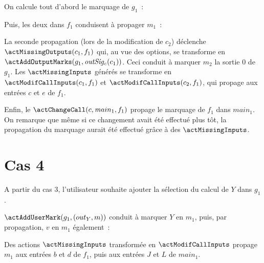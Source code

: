 On calcule tout d'abord le marquage de $g_1$~:

\bb

Puis, les deux \actChangeCall{} dans $f_1$ conduisent à propager $m_1$~:

\bb

La seconde propagation (lors de la modification de $c_2$)
déclenche $\actMissingOutputs(c_1, f_1)$
qui, au vue des options, se transforme en $\actAddOutputMarks(g_1,
\outsigc(c_1))$. Ceci conduit à marquer $m_2$ la sortie 0 de $g_1$.
Les $\actMissingInputs$ générés se transforme en $\actModifCallInputs(c_1, f_1)$
et $\actModifCallInputs(c_2, f_1)$, qui propage \spare{} aux entrées $c$ et $e$ de
$f_1$.

\bb

Enfin, le $\actChangeCall(c, {\mathit main}_1, f_1)$ propage le marquage de
$f_1$ dans ${\mathit main}_1$. On remarque que même si ce changement avait été
effectué plus tôt, la propagation du marquage aurait été effectué grâce à des
$\actMissingInputs$.

\bb


\section{Cas 4}

A partir du cas 3, l'utilisateur souhaite ajouter la sélection du calcul de $Y$
dans $g_1$.\bb

$\actAddUserMark(g_1, (out_Y, m))$ conduit à marquer $Y$ en $m_1$,
puis, par propagation, $v$ en $m_1$ également~:

\bb

Des actions $\actMissingInputs$ transformée en $\actModifCallInputs$ propage
$m_1$ aux entrées $b$ et $d$ de $f_1$, puis aux entrées $J$ et $L$ de ${\mathit
main}_1$.

\bb



